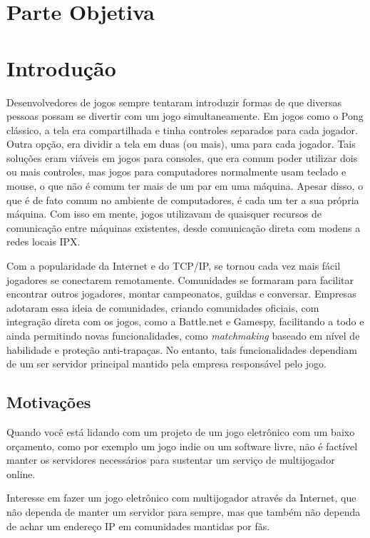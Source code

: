 \chapter*{Parte Objetiva}
\label{sec:parte_objetiva}
\chapter{Introdução}
\label{sec:intr}

Desenvolvedores de jogos sempre tentaram introduzir formas de que diversas
pessoas possam se divertir com um jogo simultaneamente. Em jogos como o Pong
clássico, a tela era compartilhada e tinha controles separados para cada
jogador. Outra opção, era dividir a tela em duas (ou mais), uma para cada
jogador. Tais soluções eram viáveis em jogos para consoles, que era comum poder
utilizar dois ou mais controles, mas jogos para computadores normalmente usam
teclado e mouse, o que não é comum ter mais de um par em uma máquina.
Apesar disso, o que é de fato comum no ambiente de computadores, é cada um ter
a sua própria máquina. Com isso em mente, jogos utilizavam de quaisquer recursos
de comunicação entre máquinas existentes, desde comunicação direta com modens
a redes locais IPX.

Com a popularidade da Internet e do TCP/IP, se tornou cada vez mais fácil
jogadores se conectarem remotamente. Comunidades se formaram para facilitar
encontrar outros jogadores, montar campeonatos, guildas e conversar. Empresas
adotaram essa ideia de comunidades, criando comunidades oficiais, com integração
direta com os jogos, como a Battle.net e Gamespy, facilitando a todo e ainda
permitindo novas funcionalidades, como \textit{matchmaking} baseado em nível de
habilidade e proteção anti-trapaças. No entanto, tais funcionalidades dependiam
de um ser servidor principal mantido pela empresa responsável pelo jogo.


\section{Motivações}
\label{sec:intr:motivacoes}

Quando você está lidando com um projeto de um jogo eletrônico com um baixo
orçamento, como por exemplo um jogo indie ou um software livre, não é factível
manter os servidores necessários para sustentar um serviço de multijogador
online.


Interesse em fazer um jogo eletrônico com multijogador através da Internet, que não dependa de manter um servidor para sempre, mas que também não dependa de achar um endereço IP em comunidades mantidas por fãs.

